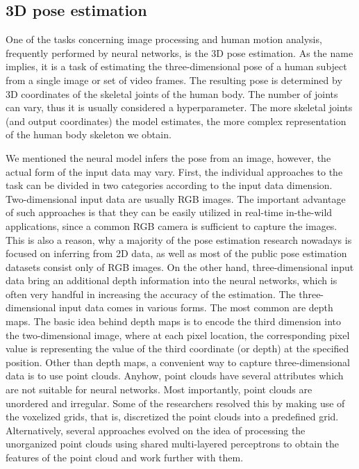 \subsection{3D pose estimation}
One of the tasks concerning image processing and human motion analysis, frequently performed by neural networks, is the 3D pose estimation. As the name implies, it is a task of estimating the three-dimensional pose of a human subject from a single image or set of video frames. The resulting pose is determined by 3D coordinates of the skeletal joints of the human body. The number of joints can vary, thus it is usually considered a hyperparameter. The more skeletal joints (and output coordinates) the model estimates, the more complex representation of the human body skeleton we obtain.\par
\vspace{5mm}
\noindent
We mentioned the neural model infers the pose from an image, however, the actual form of the input data may vary. First, the individual approaches to the task can be divided in two categories according to the input data dimension. Two-dimensional input data are usually RGB images. The important advantage of such approaches is that they can be easily utilized in real-time in-the-wild applications, since a common RGB camera is sufficient to capture the images. This is also a reason, why a majority of the pose estimation research nowadays is focused on inferring from 2D data, as well as most of the public pose estimation datasets consist only of RGB images. On the other hand, three-dimensional input data bring an additional depth information into the neural networks, which is often very handful in increasing the accuracy of the estimation. The three-dimensional input data comes in various forms. The most common are depth maps. The basic idea behind depth maps is to encode the third dimension into the two-dimensional image, where at each pixel location, the corresponding pixel value is representing the value of the third coordinate (or depth) at the specified position. Other than depth maps, a convenient way to capture three-dimensional data is to use point clouds. Anyhow, point clouds have several attributes which are not suitable for neural networks. Most importantly, point clouds are unordered and irregular. Some of the researchers resolved this by making use of the voxelized grids, that is, discretized the point clouds into a predefined grid. Alternatively, several approaches evolved on the idea of processing the unorganized point clouds using shared multi-layered perceptrons to obtain the features of the point cloud and work further with them.\par


